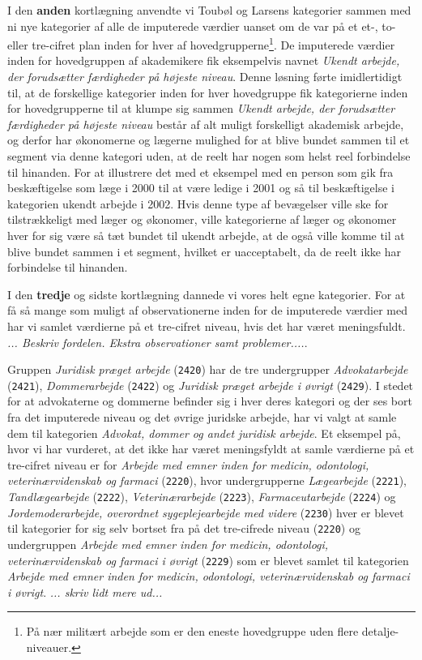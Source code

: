 I den \textbf{anden} kortlægning anvendte vi Toubøl og Larsens kategorier sammen med ni nye kategorier af alle de imputerede værdier uanset om de var på et et-, to- eller tre-cifret plan inden for hver af hovedgrupperne\footnote{På nær militært arbejde som er den eneste hovedgruppe uden flere detalje-niveauer.}. De imputerede værdier inden for hovedgruppen af akademikere fik eksempelvis navnet \emph{Ukendt arbejde, der forudsætter færdigheder på højeste niveau}. Denne løsning førte imidlertidigt til, at de forskellige kategorier inden for hver hovedgruppe fik kategorierne inden for hovedgrupperne til at klumpe sig sammen \emph{Ukendt arbejde, der forudsætter færdigheder på højeste niveau} består af alt muligt forskelligt akademisk arbejde, og derfor har økonomerne og lægerne mulighed for at blive bundet sammen til et segment via denne kategori uden, at de reelt har nogen som helst reel forbindelse til hinanden. For at illustrere det med et eksempel med en person som gik fra beskæftigelse som læge i 2000 til at være ledige i 2001 og så til beskæftigelse i kategorien ukendt arbejde i 2002. Hvis denne type af bevægelser ville ske for tilstrækkeligt med læger og økonomer, ville kategorierne af læger og økonomer hver for sig være så tæt bundet til ukendt arbejde, at de også ville komme til at blive bundet sammen i et segment, hvilket er uacceptabelt, da de reelt ikke har forbindelse til hinanden.

I den \textbf{tredje} og sidste kortlægning dannede vi vores helt egne kategorier. For at få så mange som muligt af observationerne inden for de imputerede værdier med har vi samlet værdierne på et tre-cifret niveau, hvis det har været meningsfuldt. \emph{... Beskriv fordelen. Ekstra observationer samt problemer....}. %

Gruppen \emph{Juridisk præget arbejde} (\texttt{2420}) har de tre undergrupper \emph{Advokatarbejde} (\texttt{2421}), \emph{Dommerarbejde} (\texttt{2422}) og \emph{Juridisk præget arbejde i øvrigt} (\texttt{2429}). I stedet for at advokaterne og dommerne befinder sig i hver deres kategori og der ses bort fra det imputerede niveau og det øvrige juridske arbejde, har vi valgt at samle dem til kategorien \emph{Advokat, dommer og andet juridisk arbejde}. Et eksempel på, hvor vi har vurderet, at det ikke har været meningsfyldt at samle værdierne på et tre-cifret niveau er for \emph{Arbejde med emner inden for medicin, odontologi, veterinærvidenskab og farmaci} (\texttt{2220}), hvor undergrupperne \emph{Lægearbejde} (\texttt{2221}), \emph{Tandlægearbejde} (\texttt{2222}), \emph{Veterinærarbejde} (\texttt{2223}), \emph{Farmaceutarbejde} (\texttt{2224}) og \emph{Jordemoderarbejde, overordnet sygeplejearbejde med videre} (\texttt{2230}) hver er blevet til kategorier for sig selv bortset fra på det tre-cifrede niveau (\texttt{2220}) og undergruppen \emph{Arbejde med emner inden for medicin, odontologi, veterinærvidenskab og farmaci i øvrigt} (\texttt{2229}) som er blevet samlet til kategorien \emph{Arbejde med emner inden for medicin, odontologi, veterinærvidenskab og farmaci i øvrigt}. \emph{... skriv lidt mere ud...} %

